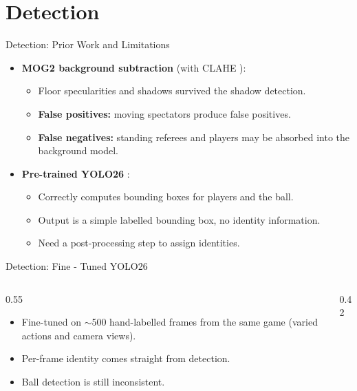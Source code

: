 \section{Detection}
\label{sec:detection}
\begin{frame}{Detection: Prior Work and Limitations}
\begin{itemize}
  \item \textbf{MOG2 background subtraction} \cite{survey} (with CLAHE \cite{clahe}):
  \begin{itemize}
    \item Floor specularities and shadows survived the shadow detection.
    \item \textbf{False positives:} moving spectators produce false positives.
    \item \textbf{False negatives:} standing referees and players may be absorbed into the background model.
  \end{itemize}
  \item \textbf{Pre-trained YOLO26} \cite{yolo_paper}:
  \begin{itemize}
    \item Correctly computes bounding boxes for players and the ball.
    \item Output is a simple labelled bounding box, no identity information.
    \item Need a post-processing step to assign identities.
  \end{itemize}
\end{itemize}
\end{frame}

\begin{frame}{Detection: Fine - Tuned YOLO26}
\begin{columns}[T]
  \begin{column}{0.55\textwidth}
    \begin{itemize}
      \item Fine-tuned on $\sim$500 hand-labelled frames from the same game (varied actions and camera views).
      \item Per-frame identity comes straight from detection.
      \item Ball detection is still inconsistent.
    \end{itemize}
  \end{column}
  \begin{column}{0.42\textwidth}
    \videobox
  \end{column}
\end{columns}
\end{frame}

